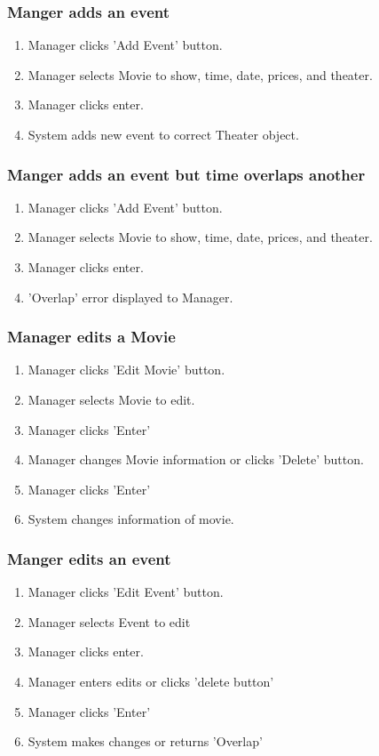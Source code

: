 \documentclass[12pt,titlepage,letterpaper]{article}
\begin{document}
\subsubsection{Manger adds an event}
\begin{enumerate}
 	\item Manager clicks 'Add Event' button.
 	\item Manager selects Movie to show, time, date, prices, and theater.
 	\item Manager clicks enter.
 	\item System adds new event to correct Theater object.
\end{enumerate}

\subsubsection{Manger adds an event but time overlaps another}
\begin{enumerate}
 	\item Manager clicks 'Add Event' button.
 	\item Manager selects Movie to show, time, date, prices, and theater.
 	\item Manager clicks enter.
 	\item 'Overlap' error displayed to Manager.
\end{enumerate}

\subsubsection{Manager edits a Movie}
\begin{enumerate}
 	\item Manager clicks 'Edit Movie' button.
 	\item Manager selects Movie to edit.
 	\item Manager clicks 'Enter'
 	\item Manager changes Movie information or clicks 'Delete' button.
 	\item Manager clicks 'Enter'
 	\item System changes information of movie.
\end{enumerate}

\subsubsection{Manger edits an event}
\begin{enumerate}
 	\item Manager clicks 'Edit Event' button.
 	\item Manager selects Event to edit
 	\item Manager clicks enter.
 	\item Manager enters edits or clicks 'delete button'
 	\item Manager clicks 'Enter'
 	\item System makes changes or returns 'Overlap'
\end{enumerate}
\end{document}
